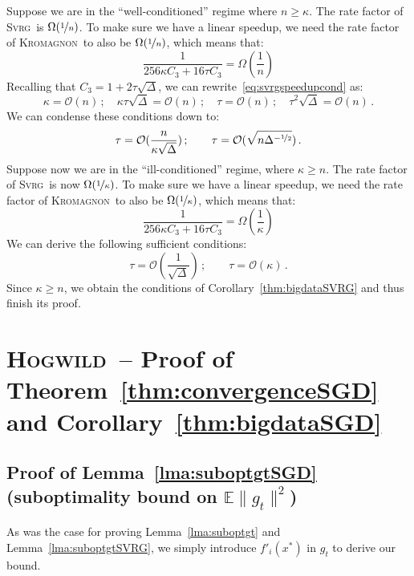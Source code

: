 \documentclass[twoside, 11pt]{article}
\newcommand{\overlap}{\tau}
\newcommand{\sparsity}{\Delta}
\newcommand{\E}{\mathbb{E}}
\newcommand{\SVRG}{\textsc{Svrg}}
\newcommand{\Hogwild}{\textsc{Hogwild}}
\newcommand{\KROMAGNON}{\textsc{Kromagnon}}
\begin{document}
Suppose we are in the ``well-conditioned'' regime where $n \geq \kappa$. The rate factor of \SVRG\ is $\Omega(\nicefrac{1}{n})$.
To make sure we have a linear speedup, we need the rate factor of \KROMAGNON\ to also be $\Omega(\nicefrac{1}{n})$, which means that:
\begin{equation}\label{eq:svrgspeedupcond}
\frac{1}{256 \kappa C_3 + 16 \overlap C_3} = \Omega(\frac{1}{n})
\end{equation}
Recalling that $C_3 = 1 + 2\overlap \sqrt{\sparsity} $, we can rewrite~\eqref{eq:svrgspeedupcond} as:
\begin{equation}
\kappa = \mathcal{O}(n)\,; \quad \kappa \overlap \sqrt{\sparsity} = \mathcal{O}(n)\,; \quad \overlap = \mathcal{O}(n)\,; \quad \overlap^2 \sqrt{\sparsity} = \mathcal{O}(n) \,.
\end{equation}
We can condense these conditions down to:
\begin{equation}
\overlap = \mathcal{O}(\frac{n}{\kappa \sqrt{\sparsity}})\, ; \qquad \overlap = \mathcal{O}(\sqrt{n \sparsity^{-\nicefrac{1}{2}}}) \,.
\end{equation}
Suppose now we are in the ``ill-conditioned'' regime, where $\kappa \geq n$.
The rate factor of \SVRG\ is now $\Omega(\nicefrac{1}{\kappa})$.
To make sure we have a linear speedup, we need the rate factor of \KROMAGNON\ to also be $\Omega(\nicefrac{1}{\kappa})$, which means that:
\begin{equation}\label{eq:svrgspeedupcondIC}
\frac{1}{256 \kappa C_3 + 16 \overlap C_3} = \Omega(\frac{1}{\kappa})
\end{equation}
We can derive the following sufficient conditions:
\begin{equation}
\overlap = \mathcal{O}(\frac{1}{\sqrt{\sparsity}}) \, ; \qquad \overlap = \mathcal{O}(\kappa) \,.
\end{equation}
Since $\kappa \geq n$, we obtain the conditions of Corollary~\ref{thm:bigdataSVRG} and thus finish its proof.
\hfill \BlackBox

\section{\Hogwild\ -- Proof of Theorem~\ref{thm:convergenceSGD} and Corollary~\ref{thm:bigdataSGD}}\label{apx:SGD}
\subsection{Proof of Lemma~\ref{lma:suboptgtSGD} (suboptimality bound on $\E \|g_t\|^2$)}\label{apx:SGDlemma}
As was the case for proving Lemma~\ref{lma:suboptgt} and Lemma~\ref{lma:suboptgtSVRG}, we simply introduce $f'_i(x^*)$ in $g_t$ to derive our bound.
\end{document}
